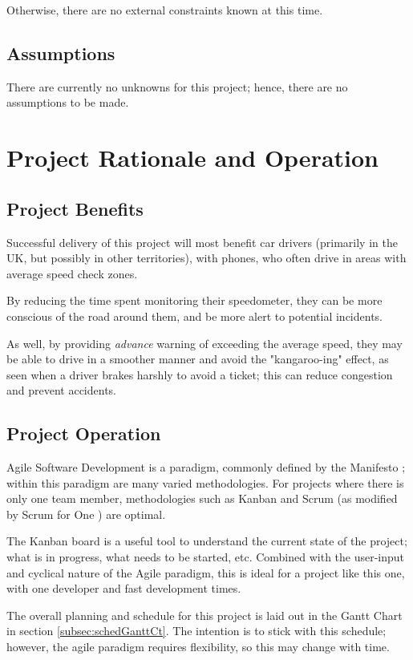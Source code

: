 \documentclass[11pt, a4paper, notitlepage]{report}
\begin{document}
Otherwise, there are no external constraints known at this time.

\section{Assumptions}
There are currently no unknowns for this project; hence, there are no 
assumptions to be made.

\chapter{Project Rationale and Operation}
\section{Project Benefits}
Successful delivery of this project will most benefit car drivers (primarily in 
the UK, but possibly in other territories), with phones, who often drive in 
areas with average speed check zones. 

By reducing the time spent monitoring their speedometer, they can be more 
conscious of the road around them, and be more alert to potential incidents.

As well, by providing \textit{advance} warning of exceeding the average speed, 
they may be able to drive in a smoother manner and avoid the "kangaroo-ing" 
effect, as seen when a driver brakes harshly to avoid a ticket; this can reduce 
congestion and prevent accidents.

\section{Project Operation}\label{sec:projectOperation}
Agile Software Development is a paradigm, commonly defined by the Manifesto \citep{AgileManifesto}; within this paradigm are many varied methodologies. For 
projects where there is only one team member, methodologies such as Kanban and 
Scrum (as modified by Scrum for One \citep{ScrumForOne}) are optimal. %

The Kanban board is a useful tool to understand the current state of the 
project; what is in progress, what needs to be started, etc. Combined with the 
user-input and cyclical nature of the Agile paradigm, this is ideal for a 
project like this one, with one developer and fast development times.

The overall planning and schedule for this project is laid out in the Gantt 
Chart in section \ref{subsec:schedGanttCt}. The intention is to stick with this 
schedule; however, the agile paradigm requires flexibility, so this may change 
with time.
\end{document}
